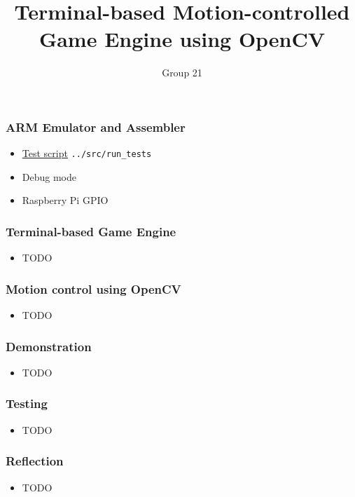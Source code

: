 \documentclass{beamer}
\title{Terminal-based Motion-controlled Game Engine using OpenCV}
\author{Group 21}
\begin{document}
	
\frame{\titlepage}

\begin{frame}
	\frametitle{ARM Emulator and Assembler}
	\begin{itemize}
		\item \href{run:../src/run_tests}{Test script} \texttt{../src/run\_tests}
		\item Debug mode
		\item Raspberry Pi GPIO
	\end{itemize}
\end{frame}

\begin{frame}
	\frametitle{Terminal-based Game Engine}
	\begin{itemize}
		\item TODO
	\end{itemize}
\end{frame}

\begin{frame}
\frametitle{Motion control using OpenCV}
\begin{itemize}
	\item TODO
\end{itemize}
\end{frame}

\begin{frame}
\frametitle{Demonstration}
\begin{itemize}
	\item TODO
\end{itemize}
\end{frame}

\begin{frame}
\frametitle{Testing}
\begin{itemize}
	\item TODO
\end{itemize}
\end{frame}

\begin{frame}
\frametitle{Reflection}
\begin{itemize}
	\item TODO
\end{itemize}
\end{frame}
\end{document}
